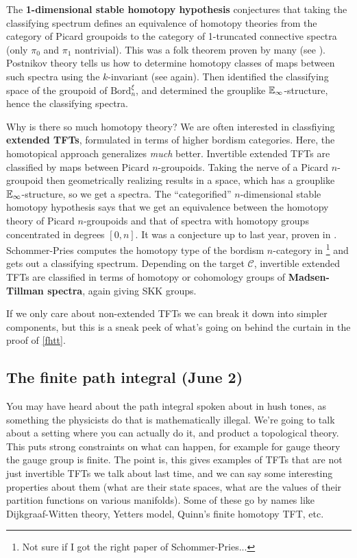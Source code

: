 The \textbf{1-dimensional stable homotopy hypothesis} conjectures that taking the classifying spectrum defines an equivalence of homotopy theories from the category of Picard groupoids to the category of 1-truncated connective spectra (only $\pi_0$ and $\pi_1$ nontrivial). This was a folk theorem proven by many (see \cite{jo}). Postnikov theory tells us how to determine homotopy classes of maps between such spectra using the $k$-invariant (see \cite{jo} again). Then \cite{gmtw} identified the classifying space of the groupoid of $\mathrm{Bord}_n ^{\xi}$, and \cite{nguyen} determined the grouplike $\mathbb{E}_{\infty}$-structure, hence the classifying spectra.

Why is there so much homotopy theory? We are often interested in classfiying \textbf{extended TFTs}, formulated in terms of higher bordism categories. Here, the homotopical approach generalizes \emph{much} better. Invertible extended TFTs are classified by maps between Picard $n$-groupoids. Taking the nerve of a Picard $n$-groupoid then geometrically realizing results in a space, which has a grouplike $\mathbb{E}_{\infty}$-structure, so we get a spectra. The ``categorified'' $n$-dimensional stable homotopy hypothesis says that we get an equivalence between the homotopy theory of Picard $n$-groupoids and that of spectra with homotopy groups concentrated in degrees $[0,n]$. It was a conjecture up to last year, proven in \cite{mopsv}. Schommer-Pries computes the homotopy type of the bordism $n$-category in \cite{sp}\footnote{Not sure if I got the right paper of Schommer-Pries...} and gets out a classifying spectrum. Depending on the target $\mathcal{C} $, invertible extended TFTs are classified in terms of homotopy or cohomology groups of \textbf{Madsen-Tillman spectra}, again giving SKK groups.

If we only care about non-extended TFTs we can break it down into simpler components, but this is a sneak peek of what's going on behind the curtain in the proof of \cref{fhtt}.

\subsection{The finite path integral (June 2)} 
You may have heard about the path integral spoken about in hush tones, as something the physicists do that is mathematically illegal. We're going to talk about a setting where you can actually do it, and product a topological theory. This puts strong constraints on what can happen, for example for gauge theory the gauge group is finite. The point is, this gives examples of TFTs that are not just invertible TFTs we talk about last time, and we can say some interesting properties about them (what are their state spaces, what are the values of their partition functions on various manifolds). Some of these go by names like Dijkgraaf-Witten theory, Yetters model, Quinn's finite homotopy TFT, etc.

